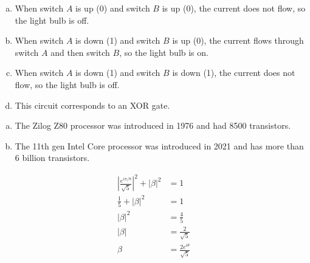 \documentclass[12pt]{extarticle}
\begin{document}
\begin{enumerate}[(a)]
\item When switch $A$ is up (0) and switch $B$ is up (0), the current does not flow, so the light bulb is off.
\item When switch $A$ is down (1) and switch $B$ is up (0), the current flows through switch $A$ and then switch $B$, so the light bulb is on.
\item When switch $A$ is down (1) and switch $B$ is down (1), the current does not flow, so the light bulb is off.
\item This circuit corresponds to an XOR gate.
\end{enumerate}


\begin{enumerate}[(a)]
\item The Zilog Z80 processor was introduced in 1976 and had 8500 transistors.
\item The 11th gen Intel Core processor was introduced in 2021 and has more than 6 billion transistors.
\end{enumerate}


\begin{align*}
\left|\frac{e^{i\pi/8}}{\sqrt{5}}\right|^2 + |\beta|^2 & = 1 \\
\frac{1}{5} + |\beta|^2 & = 1 \\
|\beta|^2 & = \frac{4}{5} \\
|\beta| & = \frac{2}{\sqrt{5}} \\
\beta & = \frac{2e^{i\theta}}{\sqrt{5}}
\end{align*}
\end{document}

